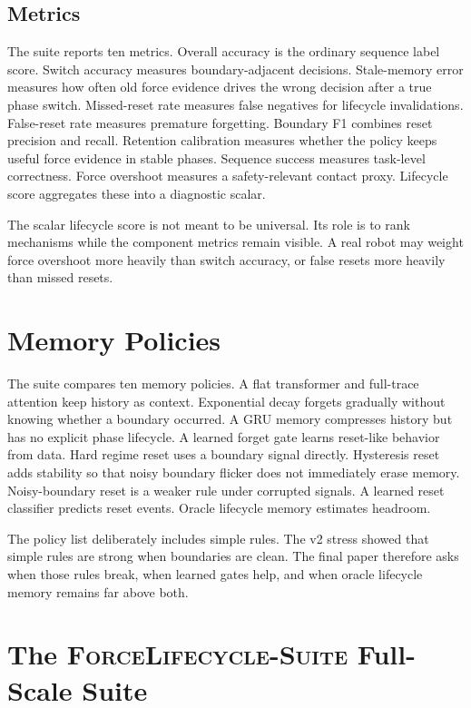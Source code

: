 \documentclass{article}
\newcommand{\suite}{\textsc{ForceLifecycle-Suite}}
\begin{document}
\subsection{Metrics}

The suite reports ten metrics. Overall accuracy is the ordinary sequence label
score. Switch accuracy measures boundary-adjacent decisions. Stale-memory error
measures how often old force evidence drives the wrong decision after a true
phase switch. Missed-reset rate measures false negatives for lifecycle
invalidations. False-reset rate measures premature forgetting. Boundary F1
combines reset precision and recall. Retention calibration measures whether the
policy keeps useful force evidence in stable phases. Sequence success measures
task-level correctness. Force overshoot measures a safety-relevant contact
proxy. Lifecycle score aggregates these into a diagnostic scalar.

The scalar lifecycle score is not meant to be universal. Its role is to rank
mechanisms while the component metrics remain visible. A real robot may weight
force overshoot more heavily than switch accuracy, or false resets more heavily
than missed resets.

\section{Memory Policies}

The suite compares ten memory policies. A flat transformer and full-trace
attention keep history as context. Exponential decay forgets gradually without
knowing whether a boundary occurred. A GRU memory compresses history but has no
explicit phase lifecycle. A learned forget gate learns reset-like behavior from
data. Hard regime reset uses a boundary signal directly. Hysteresis reset adds
stability so that noisy boundary flicker does not immediately erase memory.
Noisy-boundary reset is a weaker rule under corrupted signals. A learned reset
classifier predicts reset events. Oracle lifecycle memory estimates headroom.

The policy list deliberately includes simple rules. The v2 stress showed that
simple rules are strong when boundaries are clean. The final paper therefore
asks when those rules break, when learned gates help, and when oracle lifecycle
memory remains far above both.

\section{The \suite{} Full-Scale Suite}
\end{document}
